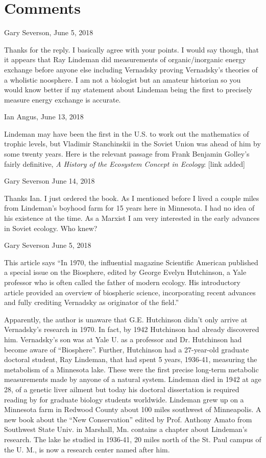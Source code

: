 \documentclass[11pt,a4paper]{article}
\begin{document}
\section*{Comments}

Gary Severson, June 5, 2018

Thanks for the reply. I basically agree with your points. I would say though,
that it appears that Ray Lindeman did measurements of organic/inorganic energy
exchange before anyone else including Vernadsky proving Vernadsky’s theories
of a wholistic noosphere. I am not a biologist but an amateur historian so you
would know better if my statement about Lindeman being the first to precisely
measure energy exchange is accurate.
    
Ian Angus, June 13, 2018

Lindeman may have been the first in the U.S. to work out the mathematics of
trophic levels, but Vladimir Stanchinskii in the Soviet Union was ahead of him
by some twenty years. Here is the relevant passage from Frank Benjamin
Golley’s fairly definitive, {\em A History of the Ecosystem Concept in
  Ecology}: [link added]

Gary Severson June 14, 2018

Thanks Ian. I just ordered the book. As I mentioned before I lived a couple
miles from Lindeman’s boyhood farm for 15 years here in Minnesota. I had no
idea of his existence at the time. As a Marxist I am very interested in the
early advances in Soviet ecology. Who knew?

Gary Severson June 5, 2018

This article says “In 1970, the influential magazine Scientific American
published a special issue on the Biosphere, edited by George Evelyn
Hutchinson, a Yale professor who is often called the father of modern ecology.
His introductory article provided an overview of biospheric science,
incorporating recent advances and fully crediting Vernadsky as originator of
the field.”

Apparently, the author is unaware that G.E. Hutchinson didn’t only arrive at
Vernadsky’s research in 1970. In fact, by 1942 Hutchinson had already
discovered him. Vernadsky’s son was at Yale U. as a professor and
Dr. Hutchinson had become aware of “Biosphere”. Further, Hutchinson had a
27-year-old graduate doctoral student, Ray Lindeman, that had spent 5 years,
1936-41, measuring the metabolism of a Minnesota lake. These were the first
precise long-term metabolic measurements made by anyone of a natural system.
Lindeman died in 1942 at age 28, of a genetic liver ailment but today his
doctoral dissertation is required reading by for graduate biology students
worldwide. Lindeman grew up on a Minnesota farm in Redwood County about 100
miles southwest of Minneapolis. A new book about the “New Conservation” edited
by Prof. Anthony Amato from Southwest State Univ. in Marshall, Mn. contains a
chapter about Lindeman’s research. The lake he studied in 1936-41, 20 miles
north of the St. Paul campus of the U. M., is now a research center named
after him.
\end{document}
